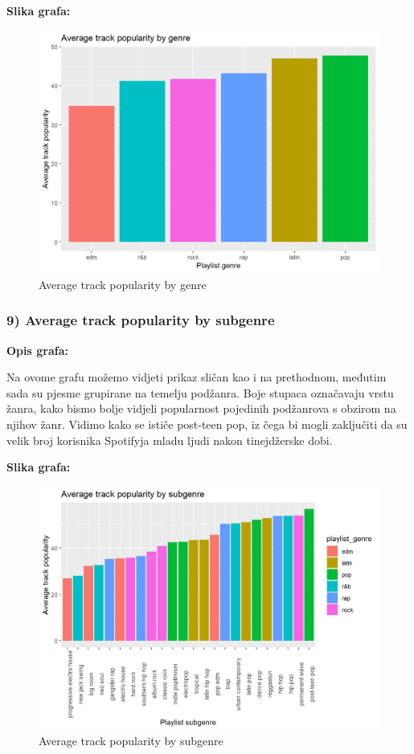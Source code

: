 	
	\textbf{Slika grafa:}
	\begin{figure}[H]
		\includegraphics[scale=0.9]{slike/genre.png}
		\centering
		\caption{Average track popularity by genre}
		
	\end{figure}
	
	
	\subsubsection{9) Average track popularity by subgenre}
	
	\textbf{Opis grafa:}
	
	Na ovome grafu možemo vidjeti prikaz sličan kao i na prethodnom, međutim sada su pjesme grupirane na temelju podžanra. Boje stupaca označavaju vrstu žanra, kako bismo bolje vidjeli popularnost pojedinih podžanrova s obzirom na njihov žanr.
	Vidimo kako se ističe post-teen pop, iz čega bi mogli zaključiti da su velik broj korisnika Spotifyja mladu ljudi nakon tinejdžerske dobi.
	
	\textbf{Slika grafa:}
	\begin{figure}[H]
		\includegraphics[scale=0.9]{slike/subgenre.png}
		\centering
		\caption{Average track popularity by subgenre}
		
	\end{figure}



